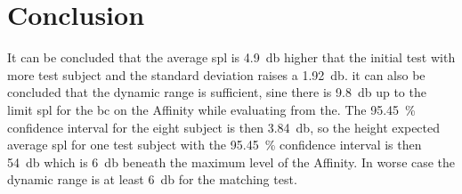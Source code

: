 \section*{Conclusion}
It can be concluded that the average \gls{spl} is  \SI{4.9}{\decibel} higher that the initial test with more test subject and the standard deviation raises a \SI{1.92}{\decibel}. it can also be concluded that the dynamic range is sufficient, sine there is \SI{9.8}{\decibel} up to the limit \gls{spl} for the \gls{bc} on the Affinity while evaluating from the. The \SI{95.45}{\percent} confidence interval for the eight subject is then  \SI{3.84}{\decibel}, so the height expected average \gls{spl} for one test subject with the \SI{95.45}{\percent} confidence interval is then \SI{54}{\decibel} which is \SI{6}{\decibel} beneath the maximum level of the Affinity. In worse case the dynamic range is at least  \SI{6}{\decibel} for the matching test.
